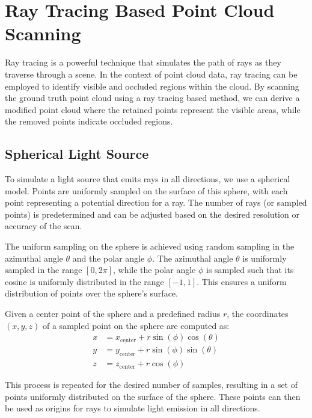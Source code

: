\documentclass[11pt, a4paper,oneside,chapterprefix=false]{scrbook}
\begin{document}
\section{Ray Tracing Based Point Cloud Scanning} \label{sec:ray tracing point cloud scanning}

Ray tracing is a powerful technique that simulates the path of rays as they traverse through a scene. In the context of point cloud data, ray tracing can be employed to identify visible and occluded regions within the cloud. By scanning the ground truth point cloud using a ray tracing based method, we can derive a modified point cloud where the retained points represent the visible areas, while the removed points indicate occluded regions.

\subsection{Spherical Light Source}

To simulate a light source that emits rays in all directions, we use a spherical model. Points are uniformly sampled on the surface of this sphere, with each point representing a potential direction for a ray. The number of rays (or sampled points) is predetermined and can be adjusted based on the desired resolution or accuracy of the scan.

\vspace{10pt}

The uniform sampling on the sphere is achieved using random sampling in the azimuthal angle \( \theta \) and the polar angle \( \phi \). The azimuthal angle \( \theta \) is uniformly sampled in the range \([0, 2\pi]\), while the polar angle \( \phi \) is sampled such that its cosine is uniformly distributed in the range \([-1, 1]\). This ensures a uniform distribution of points over the sphere's surface.

\vspace{10pt}

Given a center point of the sphere and a predefined radius \( r \), the coordinates \( (x, y, z) \) of a sampled point on the sphere are computed as:
\begin{align*}
x &= x_{\text{center}} + r \sin(\phi) \cos(\theta) \\
y &= y_{\text{center}} + r \sin(\phi) \sin(\theta) \\
z &= z_{\text{center}} + r \cos(\phi)
\end{align*}

This process is repeated for the desired number of samples, resulting in a set of points uniformly distributed on the surface of the sphere. These points can then be used as origins for rays to simulate light emission in all directions.
\end{document}
